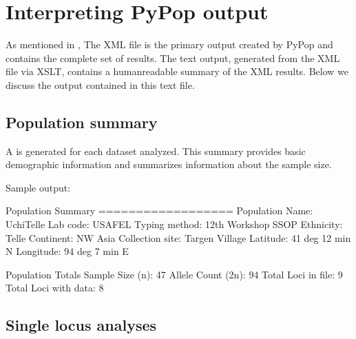 \documentclass[letterpaper,10pt,english,openany,oneside]{sphinxmanual}
\begin{document}
\sphinxstepscope


\chapter{Interpreting PyPop output}
\label{\detokenize{docs/guide-chapter-instructions:interpreting-pypop-output}}\label{\detokenize{docs/guide-chapter-instructions::doc}}
\sphinxAtStartPar
As mentioned in {\hyperref[\detokenize{docs/guide-chapter-usage:guide-usage-intro-run-details}]{}}, The XML file
is the primary output created by PyPop and contains the complete set of
results. The text output, generated from the XML file via XSLT, contains
a human\sphinxhyphen{}readable summary of the XML results. Below we discuss the output
contained in this text file.


\section{Population summary}
\label{\detokenize{docs/guide-chapter-instructions:population-summary}}\label{\detokenize{docs/guide-chapter-instructions:instructions-pop-summary}}
\sphinxAtStartPar
A  is generated for each dataset analyzed. This
summary provides basic demographic information and summarizes
information about the sample size.

\sphinxAtStartPar
Sample output:

\begin{sphinxVerbatim}[commandchars=\\\{\}]
Population Summary
==================
Population Name: UchiTelle
       Lab code: USAFEL
  Typing method: 12th Workshop SSOP
      Ethnicity: Telle
      Continent: NW Asia
Collection site: Targen Village
       Latitude: 41 deg 12 min N
      Longitude: 94 deg 7 min E

Population Totals
\PYGZus{}\PYGZus{}\PYGZus{}\PYGZus{}\PYGZus{}\PYGZus{}\PYGZus{}\PYGZus{}\PYGZus{}\PYGZus{}\PYGZus{}\PYGZus{}\PYGZus{}\PYGZus{}\PYGZus{}\PYGZus{}\PYGZus{}
Sample Size (n): 47
Allele Count (2n): 94
Total Loci in file: 9
Total Loci with data: 8
\end{sphinxVerbatim}


\section{Single locus analyses}
\label{\detokenize{docs/guide-chapter-instructions:single-locus-analyses}}\label{\detokenize{docs/guide-chapter-instructions:instructions-locus-info}}
\end{document}

